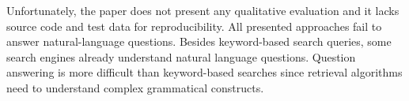 Unfortunately, the paper does not present any qualitative evaluation and it lacks source code and test data for reproducibility. 
All presented approaches fail to answer natural-language questions.
Besides keyword-based search queries, some search engines already understand natural language questions. Question answering is more difficult than keyword-based searches since retrieval algorithms need to understand complex grammatical constructs.

